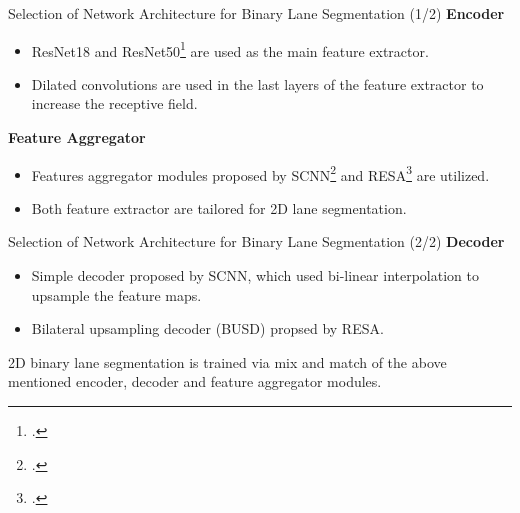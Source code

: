 \documentclass[aspectratio=169]{beamer}
\begin{document}
\begin{frame}{Selection of Network Architecture for Binary Lane Segmentation (1/2)}
    \textbf{Encoder}
    \begin{itemize}
        \item ResNet18 and ResNet50\footcite{DBLP:journals/corr/HeZRS15} are used as the main feature extractor.
        \item Dilated convolutions are used in the last layers of the feature extractor to increase the receptive field.
    \end{itemize}

    \textbf{Feature Aggregator}
    \begin{itemize}
        \item Features aggregator modules proposed by SCNN\footcite{pan2018SCNN} and RESA\footcite{DBLP:journals/corr/abs-2008-13719} are utilized.
        \item Both feature extractor are tailored for 2D lane segmentation.
    \end{itemize}
\end{frame}

\begin{frame}{Selection of Network Architecture for Binary Lane Segmentation (2/2)}
    \textbf{Decoder}
    \begin{itemize}
        \item Simple decoder proposed by SCNN, which used bi-linear interpolation to upsample the feature maps.
        \item Bilateral upsampling decoder (BUSD) propsed by RESA.
    \end{itemize}


    2D binary lane segmentation is trained via mix and match of the above mentioned encoder, decoder and feature aggregator modules.

\end{frame}
\end{document}
